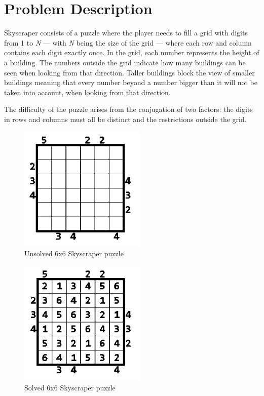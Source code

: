 \documentclass{llncs}
\begin{document}
%
\section{Problem Description}
%
Skyscraper consists of a puzzle where the player needs to fill a grid with digits from 1 to \textit{N} --- with \textit{N} being the size of the grid --- where each row and column contains each digit exactly once. In the grid, each number represents the height of a building. The numbers outside the grid indicate how many buildings can be seen when looking from that direction. Taller buildings block the view of smaller buildings meaning that every number beyond a number bigger than it will not be taken into account, when looking from that direction.

The difficulty of the puzzle arises from the conjugation of two factors: the digits in rows and columns must all be distinct and the restrictions outside the grid.

\begin{figure}[h!]
\begin{center}
\includegraphics[height=6cm,width=6cm]{images/skyscraper_unsolved.png}
\caption{Unsolved 6x6 Skyscraper puzzle}
\label{Figure 1}
\end{center}
\end{figure}

\begin{figure}[h!]
\begin{center}
\includegraphics[height=6cm,width=6cm]{images/skyscraper_solved.png}
\caption{Solved 6x6 Skyscraper puzzle}
\label{Figure 2}
\end{center}
\end{figure}
\end{document}
